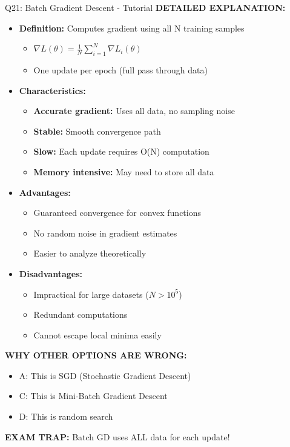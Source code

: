\documentclass[8pt]{beamer}
\begin{document}
\begin{frame}{Q21: Batch Gradient Descent - Tutorial}
		\vspace{0.05cm}
		\textbf{DETAILED EXPLANATION:}
		\begin{itemize}
			\item \textbf{Definition:} Computes gradient using all N training samples
			\begin{itemize}
				\item $\nabla L(\theta) = \frac{1}{N}\sum_{i=1}^N \nabla L_i(\theta)$
				\item One update per epoch (full pass through data)
			\end{itemize}
			\item \textbf{Characteristics:}
			\begin{itemize}
				\item \textbf{Accurate gradient:} Uses all data, no sampling noise
				\item \textbf{Stable:} Smooth convergence path
				\item \textbf{Slow:} Each update requires O(N) computation
				\item \textbf{Memory intensive:} May need to store all data
			\end{itemize}
			\item \textbf{Advantages:}
			\begin{itemize}
				\item Guaranteed convergence for convex functions
				\item No random noise in gradient estimates
				\item Easier to analyze theoretically
			\end{itemize}
			\item \textbf{Disadvantages:}
			\begin{itemize}
				\item Impractical for large datasets ($N > 10^5$)
				\item Redundant computations
				\item Cannot escape local minima easily
			\end{itemize}
		\end{itemize}
		
		\vspace{0.05cm}
		\textcolor{myred}{\textbf{WHY OTHER OPTIONS ARE WRONG:}}
		\begin{itemize}
			\item \textcolor{myred}{A:} This is SGD (Stochastic Gradient Descent)
			\item \textcolor{myred}{C:} This is Mini-Batch Gradient Descent
			\item \textcolor{myred}{D:} This is random search
		\end{itemize}
		
		\textcolor{myred}{\textbf{EXAM TRAP:}} Batch GD uses \textcolor{myblue}{ALL data} for each update!
	\end{frame}
	
\end{document}

